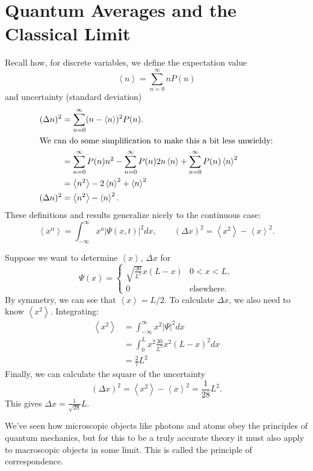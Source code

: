 \documentclass[../p052main.tex]{subfiles}
\begin{document}
\section{Quantum Averages and the Classical Limit}
Recall how, for discrete variables, we define the expectation value
\[ \left< n \right> = \sum_{n=0}^{\infty} nP(n) \]
and uncertainty (standard deviation)
\begin{align*}
    (\Delta n)^2 &= \sum_{n=0}^{\infty} (n - \left< n \right>)^2P(n). \\
    \intertext{We can do some simplification to make this a bit less unwieldy:}
    &= \sum_{n=0}^{\infty} P(n) n^2 - \sum_{n=0}^{\infty} P(n) 2n\left< n \right> + \sum_{n=0}^{\infty}P(n) \left< n \right>^2 \\
    &= \left< n^2 \right> - 2\left< n \right>^2 + \left< n \right>^2 \\
    (\Delta n)^2 &= \left< n^2 \right> - \left< n \right>^2.
\end{align*}
These definitions and results generalize nicely to the continuous case:
\[ \left< x^{\alpha} \right> = \int_{-\infty}^{\infty} x^{a} |\Psi(x,t)|^2 dx, \qquad (\Delta x)^2 = \left< x^2 \right> - \left< x \right>^2. \]

\begin{example}
    Suppose we want to determine $\left< x \right>$, $\Delta x$ for
    \[ \Psi(x) = \begin{cases} \sqrt{\frac{30}{L^{5}}} x (L - x) & 0 < x < L, \\ 0 & \text{elsewhere}. \end{cases} \]
    By symmetry, we can see that $\left< x \right> = L/2$.
    To calculate $\Delta x$, we also need to know $\left< x^2 \right>$.
    Integrating:
    \begin{align*}
        \left< x^2 \right> &= \int_{-\infty}^{\infty} x^2 |\Psi|^2dx \\
        &= \int_{0}^{L}x^2 \frac{30}{L^{5}} x^2 (L - x)^2 dx \\
        &= \frac{2}{7}L^2
    \end{align*}
    Finally, we can calculate the square of the uncertainty
    \[ (\Delta x)^2 = \left< x^2 \right> - \left< x \right>^2 = \frac{1}{28}L^2. \]
    This gives $\Delta x = \frac{1}{\sqrt{28}}L$.
\end{example}

We've seen how microscopic objects like photons and atoms obey the principles of quantum mechanics, but for this to be a truly accurate theory it must also apply to macroscopic objects in some limit.
This is called the principle of correspondence.
\end{document}
